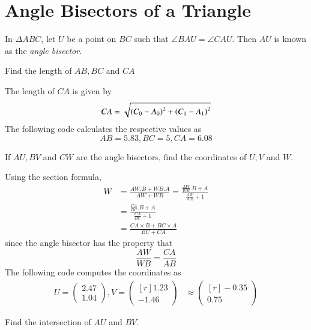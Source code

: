 \documentclass[journal,12pt,twocolumn]{IEEEtran}
\begin{document}
\section{Angle Bisectors of a Triangle}
%
\begin{definition}
In $\Delta ABC$, let $U$ be a point on $BC$ such that $\angle BAU = \angle CAU$. Then $AU$ is known as the {\em angle bisector}.
\end{definition}
\begin{problem}
Find the length of $AB,BC$ and $CA$
\end{problem}
\solution The length of $CA$ is given by
\begin{align}
CA = \sqrt{\left(C_0-A_0\right)^2 + \left(C_1 - A_1\right)^2}
\end{align}
The following code calculates the respective values as
%
\begin{equation}
AB =  5.83, BC =  5, CA =  6.08
\end{equation}
%

\begin{problem}
If $AU,BV$ and $CW$ are the angle bisectors, find the coordinates of $U,V$ and $W$.
\end{problem}
\solution Using the section formula,
\begin{align}
W &= \frac{AW.B+WB.A}{AW + WB} = \frac{\frac{AW}{WB}.B+A}{\frac{AW}{WB} + 1}
\\
&= \frac{\frac{CA}{BC}.B+A}{\frac{CA}{BC} + 1}
\\
&= \frac{{CA}\times B+{BC}\times A}{{BC} + {CA}}
\end{align}
since the angle bisector has the property that
%
\begin{equation}
\frac{AW}{WB} = \frac{CA}{AB}
\end{equation}
%
The following code computes the coordinates as
\begin{align}
U=
\begin{pmatrix}
2.47
\\
1.04
\end{pmatrix},
V =
\begin{pmatrix*}[r]
1.23
\\
-1.46
\end{pmatrix*}
& \approx 
\begin{pmatrix*}[r]
-0.35
\\
0.75
\end{pmatrix*} 
\end{align}
%

\begin{problem}
Find the intersection of $AU$ and $BV$.%
\end{problem}
\end{document}
